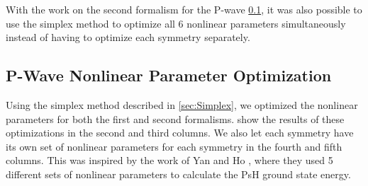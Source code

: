 \documentclass[Dissertation.tex]{subfiles}
\begin{document}
With the work on the second formalism for the P-wave \cref{sec:PWaveOpt}, it 
was also possible to use the simplex method to optimize all 6 nonlinear 
parameters simultaneously instead of having to optimize each symmetry 
separately. %


\subsection{P-Wave Nonlinear Parameter Optimization}
\label{sec:PWaveOpt}

Using the simplex method described in \cref{sec:Simplex}, we optimized the nonlinear parameters for both the first and second formalisms.  show the results of these optimizations in the second and third columns. We also let each symmetry have its own set of nonlinear parameters for each symmetry in the fourth and fifth columns. This was inspired by the work of Yan and Ho \cite{Yan1999}, where they used 5 different sets of nonlinear parameters to calculate the PsH ground state energy.
\end{document}
